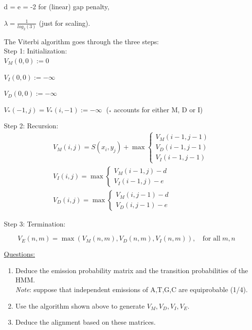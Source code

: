 \documentclass[a4paper,11pt]{article}
\begin{document}
d = e = -2 for (linear) gap penalty,

$\lambda = \frac{1}{log_2(3)}$ (just for scaling).

\newpage
The Viterbi algorithm goes through the three steps:\\


Step 1: Initialization:\\

$V_M(0,0):=0$

$V_I(0,0):=-\infty$

$V_D(0,0):=-\infty$

$V_*(-1,j)=V_*(i,-1):=-\infty \;$ ($_*$ accounts for either M, D or I)
\vspace{0.5cm}

Step 2: Recursion:
\begin{eqnarray}
&&
V_M(i,j) =S(x_{i},y_{j})+\max 
	\left\{ \begin{array}{l}
	 V_M(i-1,j-1) \\
     V_D(i-1,j-1) \\
     V_I(i-1,j-1)
    \end{array} \right.\nonumber\\
&&
V_I(i,j) =\max \left\{ 
    \begin{array}{ll}
     V_M(i-1,j)-d \\
     V_I(i-1,j)-e 
    \end{array} \right.\nonumber\\
&&
V_D(i,j) =\max \left\{ 
    \begin{array}{ll}
     V_M(i,j-1)-d\\
     V_D(i,j-1)-e
    \end{array} \right.\nonumber
\end{eqnarray}


Step 3: Termination:

$$V_E(n,m)=\max(V_M(n,m),V_D(n,m),V_I(n,m)), \quad \text{for all} \;  m,n$$

\underline{Questions:}
\begin{enumerate}
\item Deduce the emission probability matrix and the transition probabilities of the HMM.\\
	\textit{Note}: suppose that independent emissions of A,T,G,C are equiprobable (1/4).
\item Use the algorithm shown above to generate $V_M, V_D, V_I, V_E$.
\item Deduce the alignment based on these matrices.
\end{enumerate}
\end{document}
